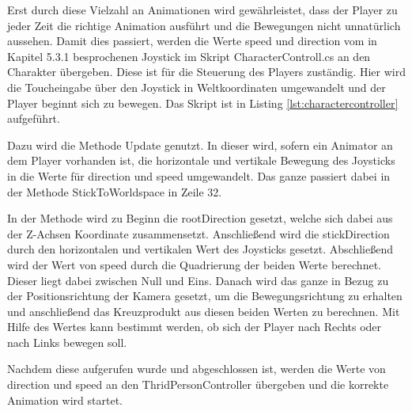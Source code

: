 			Erst durch diese Vielzahl an Animationen wird gewährleistet, dass der Player zu jeder Zeit die richtige Animation ausführt und die Bewegungen nicht unnatürlich aussehen. Damit dies passiert, werden die Werte speed und direction vom in Kapitel 5.3.1 besprochenen Joystick im Skript CharacterControll.cs an den Charakter übergeben. Diese ist für die Steuerung des Players zuständig. Hier wird die Toucheingabe über den Joystick in Weltkoordinaten umgewandelt und der Player beginnt sich zu bewegen. Das Skript ist in Listing \ref{lst:charactercontroller} aufgeführt.
	
			Dazu wird die Methode Update genutzt. In dieser wird, sofern ein Animator an dem Player vorhanden ist, die horizontale und vertikale Bewegung des Joysticks in die Werte für direction und speed umgewandelt. Das ganze passiert dabei in der Methode StickToWorldspace in Zeile 32. 

			In der Methode wird zu Beginn die rootDirection gesetzt, welche sich dabei aus der Z-Achsen Koordinate zusammensetzt. Anschließend wird die stickDirection durch den horizontalen und vertikalen Wert des Joysticks gesetzt. Abschließend wird der Wert von speed durch die Quadrierung der beiden Werte berechnet. Dieser liegt dabei zwischen Null und Eins. Danach wird das ganze in Bezug zu der Positionsrichtung der Kamera gesetzt, um die Bewegungsrichtung zu erhalten und anschließend das Kreuzprodukt aus diesen beiden Werten zu berechnen. Mit Hilfe des Wertes kann bestimmt werden, ob sich der Player nach Rechts oder nach Links bewegen soll.
	
			Nachdem diese aufgerufen wurde und abgeschlossen ist, werden die Werte von direction und speed an den ThridPersonController übergeben und die korrekte Animation wird startet.

